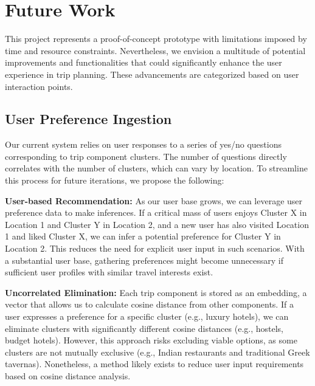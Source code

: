 \documentclass[12pt,a4paper]{report}
\begin{document}
\chapter{Future Work}


This project represents a proof-of-concept prototype with limitations imposed by time and resource constraints. Nevertheless, we envision a multitude of potential improvements and functionalities that could significantly enhance the user experience in trip planning. These advancements are categorized based on user interaction points.

\section{User Preference Ingestion}

Our current system relies on user responses to a series of yes/no questions corresponding to trip component clusters. The number of questions directly correlates with the number of clusters, which can vary by location. To streamline this process for future iterations, we propose the following:
\begin{description}
\item{\textbf{User-based Recommendation:} As our user base grows, we can leverage user preference data to make inferences. If a critical mass of users enjoys Cluster X in Location 1 and Cluster Y in Location 2, and a new user has also visited Location 1 and liked Cluster X, we can infer a potential preference for Cluster Y in Location 2. This reduces the need for explicit user input in such scenarios. With a substantial user base, gathering preferences might become unnecessary if sufficient user profiles with similar travel interests exist.}
\item{\textbf{Uncorrelated Elimination:} Each trip component is stored as an embedding, a vector that allows us to calculate cosine distance from other components. If a user expresses a preference for a specific cluster (e.g., luxury hotels), we can eliminate clusters with significantly different cosine distances (e.g., hostels, budget hotels). However, this approach risks excluding viable options, as some clusters are not mutually exclusive (e.g., Indian restaurants and traditional Greek tavernas). Nonetheless, a method likely exists to reduce user input requirements based on cosine distance analysis.}
\end{description}
\end{document}
